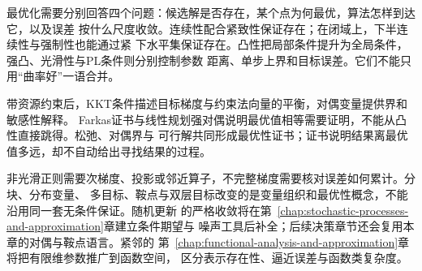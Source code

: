 最优化需要分别回答四个问题：候选解是否存在，某个点为何最优，算法怎样到达它，以及误差
按什么尺度收敛。连续性配合紧致性保证存在；在闭域上，下半连续性与强制性也能通过紧
下水平集保证存在。凸性把局部条件提升为全局条件，强凸、光滑性与PL条件则分别控制参数
距离、单步上界和目标误差。它们不能只用“曲率好”一语合并。

带资源约束后，KKT条件描述目标梯度与约束法向量的平衡，对偶变量提供界和敏感性解释。
Farkas证书与线性规划强对偶说明最优值相等需要证明，不能从凸性直接跳得。松弛、对偶界与
可行解共同形成最优性证书；证书说明结果离最优值多远，却不自动给出寻找结果的过程。

非光滑正则需要次梯度、投影或邻近算子，不完整梯度需要核对误差如何累计。分块、分布变量、
多目标、鞍点与双层目标改变的是变量组织和最优性概念，不能沿用同一套无条件保证。随机更新
的严格收敛将在第~\ref{chap:stochastic-processes-and-approximation}章建立条件期望与
噪声工具后补全；后续决策章节还会复用本章的对偶与鞍点语言。紧邻的
第~\ref{chap:functional-analysis-and-approximation}章将把有限维参数推广到函数空间，
区分表示存在性、逼近误差与函数类复杂度。
